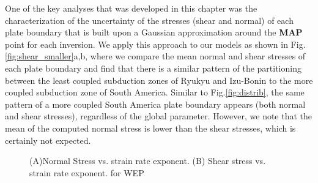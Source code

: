 \documentclass[12pt]{article}
\begin{document}
One of the key analyses that was developed in this chapter was the characterization of the uncertainty of the stresses (shear and normal) of each plate boundary that is built upon a Gaussian approximation around the \textbf{MAP} point for each inversion. We apply this approach to our models as shown in Fig.\ref{fig:shear_smaller}a,b, where we compare the mean normal and shear stresses of each plate boundary and find that there is a similar pattern of the partitioning between the least coupled subduction zones of Ryukyu and Izu-Bonin to the more coupled subduction zone of South America. Similar to Fig.\ref{fig:distrib}, the same pattern of a more coupled South America plate boundary appears (both normal and shear stresses), regardless of the global parameter. However, we note that the mean of the computed normal stress is lower than the shear stresses, which is certainly not expected.



\begin{figure}[H]
\centering
\hspace{-0.85cm}
\hspace{-0.1cm}

\caption{(A)Normal Stress vs. strain rate exponent. 
(B) Shear stress vs. strain rate exponent. 
 for WEP}
\label{fig:stress_distrib1}
\end{figure}
\end{document}
